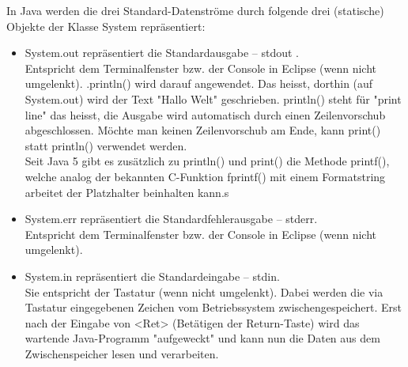 In Java werden die drei Standard-Datenströme durch folgende drei (statische) Objekte der Klasse System repräsentiert:
\begin{itemize}
	\item System.out repräsentiert die Standardausgabe – stdout .
	\\ Entspricht dem Terminalfenster bzw. der Console in Eclipse (wenn nicht umgelenkt). .println() wird darauf angewendet. Das heisst, dorthin (auf System.out) wird der Text "Hallo Welt" geschrieben. println() steht für "print line" das heisst, die Ausgabe wird automatisch durch einen Zeilenvorschub abgeschlossen. Möchte man keinen Zeilenvorschub am Ende, kann print() statt println()
	verwendet werden.\\
	Seit Java 5 gibt es zusätzlich zu println() und print() die Methode 
	printf(), welche analog der bekannten C-Funktion fprintf() mit einem 
	Formatstring arbeitet der Platzhalter beinhalten kann.s
	\item System.err repräsentiert die Standardfehlerausgabe – stderr.\\ Entspricht dem Terminalfenster bzw. der Console in Eclipse (wenn nicht umgelenkt).
	\item System.in repräsentiert die Standardeingabe – stdin. \\
	Sie entspricht der Tastatur (wenn nicht umgelenkt).
	Dabei werden die via Tastatur eingegebenen Zeichen vom Betriebssystem 
	zwischengespeichert. Erst nach der Eingabe von <Ret> (Betätigen der Return-Taste) wird das wartende 
	Java-Programm "aufgeweckt" und kann nun die Daten aus dem 
	Zwischenspeicher lesen und verarbeiten.
\end{itemize}


 



